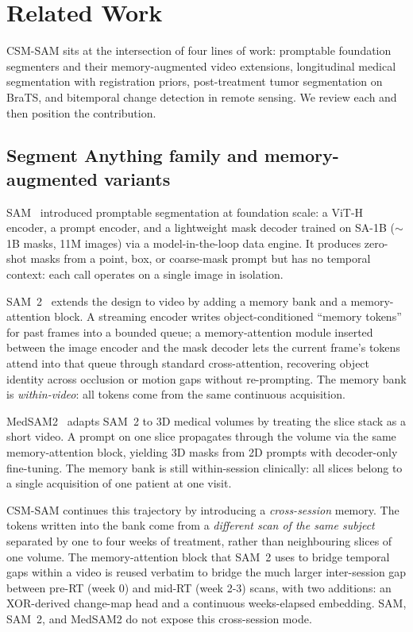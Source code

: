 \section{Related Work}
\label{sec:related}

CSM-SAM sits at the intersection of four lines of work: promptable
foundation segmenters and their memory-augmented video extensions,
longitudinal medical segmentation with registration priors,
post-treatment tumor segmentation on BraTS, and bitemporal change
detection in remote sensing. We review each and then position the
contribution.

\subsection{Segment Anything family and memory-augmented variants}
\label{sec:related:sam}

SAM~\cite{kirillov2023sam} introduced promptable segmentation at
foundation scale: a ViT-H encoder, a prompt encoder, and a
lightweight mask decoder trained on SA-1B ($\sim$1B masks, 11M
images) via a model-in-the-loop data engine. It produces zero-shot
masks from a point, box, or coarse-mask prompt but has no temporal
context: each call operates on a single image in isolation.

SAM~2~\cite{ravi2024sam2} extends the design to video by adding a
memory bank and a memory-attention block. A streaming encoder writes
object-conditioned ``memory tokens'' for past frames into a bounded
queue; a memory-attention module inserted between the image encoder
and the mask decoder lets the current frame's tokens attend into that
queue through standard cross-attention, recovering object identity
across occlusion or motion gaps without re-prompting. The memory bank
is \emph{within-video}: all tokens come from the same continuous
acquisition.

MedSAM2~\cite{ma2024medsam2} adapts SAM~2 to 3D medical volumes by
treating the slice stack as a short video. A prompt on one slice
propagates through the volume via the same memory-attention block,
yielding 3D masks from 2D prompts with decoder-only fine-tuning. The
memory bank is still within-session clinically: all slices belong to
a single acquisition of one patient at one visit.

CSM-SAM continues this trajectory by introducing a \emph{cross-session}
memory. The tokens written into the bank come from a \emph{different
scan of the same subject} separated by one to four weeks of treatment,
rather than neighbouring slices of one volume. The memory-attention
block that SAM~2 uses to bridge temporal gaps within a video is reused
verbatim to bridge the much larger inter-session gap between pre-RT
(week 0) and mid-RT (week 2-3) scans, with two additions: an
XOR-derived change-map head and a continuous weeks-elapsed embedding.
SAM, SAM~2, and MedSAM2 do not expose this cross-session mode.

